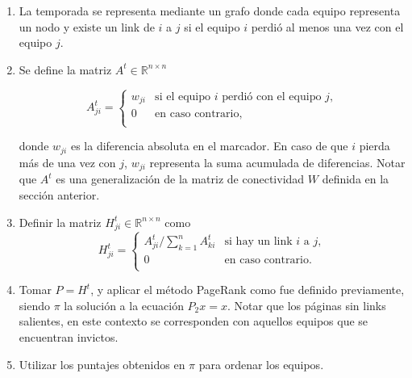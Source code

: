         \begin{enumerate}
            \item La temporada se representa mediante un grafo donde cada equipo representa un nodo y existe un link de $i$ a $j$ si el equipo $i$ perdi\'o al menos una vez con el equipo $j$.
            \item Se define la matriz $A^t \in \mathbb{R}^{n \times n}$

                \begin{equation*}
                    A_{ji}^t = \left\{
                    \begin{array}{cl}
                    w_{ji} & \text{si el equipo } i \text{ perdi\'o con el equipo } j,\\
                    0 & \text{en caso contrario, }\\
                    \end{array} \right.
                \end{equation*}

                \noindent donde $w_{ji}$ es la diferencia absoluta en el marcador. En caso de que $i$ pierda m\'as de una vez con $j$, $w_{ji}$ representa la suma acumulada de diferencias. Notar que $A^t$ es una generalizaci\'on de la matriz de conectividad $W$ definida en la secci\'on anterior.

            \item Definir la matriz $H_{ji}^t \in \mathbb{R}^{n \times n}$ como
                \begin{equation*}
                    H_{ji}^t = \left\{
                    \begin{array}{cl}
                    A_{ji}^t/\sum_{k = 1}^n A_{ki}^t & \text{si hay un link } i \text{ a } j,\\
                    0 & \text{en caso contrario.}\\
                    \end{array} \right.
                \end{equation*}

            \item Tomar $P = H^t$, y aplicar el m\'etodo PageRank como fue definido previamente, siendo $\pi$ la soluci\'on a la ecuaci\'on $P_2 x = x$. Notar que los p\'aginas sin links salientes, en este contexto se corresponden con aquellos equipos que se encuentran invictos.

            \item Utilizar los puntajes obtenidos en $\pi$ para ordenar los equipos.
        \end{enumerate}

